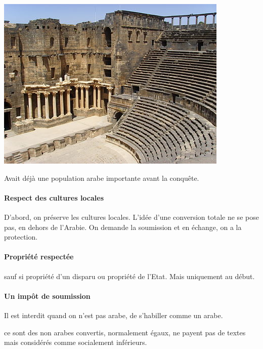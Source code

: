 \begin{Ex}
\begin{marginfigure}
\includegraphics[width=\textwidth]{HistoireIslamMediterranee/Images/TheaterBosra2.jpg}
\end{marginfigure}
    Avait déjà une population arabe importante avant la conquête. 
\end{Ex}

\paragraph{Respect des cultures locales} D'abord, on préserve les cultures locales. L'idée d'une conversion totale ne se pose pas, en dehors de l'Arabie. On demande la soumission et en échange, on a la protection. 

\paragraph{Propriété respectée} sauf si propriété d'un disparu ou propriété de l'Etat. Mais uniquement au début. 

\paragraph{Un impôt de soumission} Il est interdit quand on n'est pas arabe, de s'habiller comme un arabe. 
\begin{Def}[mawali]
    ce sont des non arabes convertis, normalement égaux, ne payent pas de textes mais considérés comme socialement inférieurs.
\end{Def}


